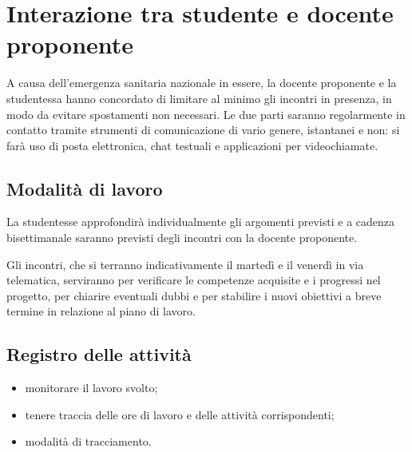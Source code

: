 
\section{Interazione tra studente e docente proponente}
A causa dell'emergenza sanitaria nazionale in essere, la docente proponente e la studentessa hanno concordato di limitare al minimo gli incontri in presenza, in modo da evitare spostamenti non necessari. Le due parti saranno regolarmente in contatto tramite strumenti di comunicazione di vario genere, istantanei e non: si farà uso di posta elettronica, chat testuali e applicazioni per videochiamate.

\subsection{Modalità di lavoro}
La studentesse approfondirà individualmente gli argomenti previsti e a cadenza bisettimanale saranno previsti degli incontri con la docente proponente.

Gli incontri, che si terranno indicativamente il martedì e il venerdì in via telematica, serviranno per verificare le competenze acquisite e i progressi nel progetto, per chiarire eventuali dubbi e per stabilire i nuovi obiettivi a breve termine in relazione al piano di lavoro.


	\subsection{Registro delle attività}
	\begin{itemize}
		\item monitorare il lavoro svolto;
		\item tenere traccia delle ore di lavoro e delle attività corrispondenti;
		\item modalità di tracciamento.
	\end{itemize}


	
